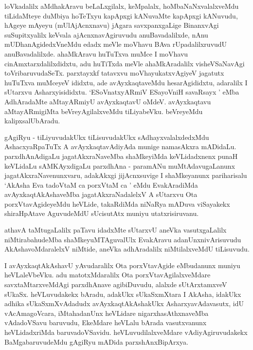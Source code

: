 \begin{artha}
loVkadalilx aMdhakAravu beLaLxgilalx, keMpalalx, hoMbaNaNxvalalxveMdu tiLidaMteye duMbiya hoTeTxyu kapApxgi kANuvaMte kapApxgi kANuvudu, hAgeye mAyeyu (mUlAjAcnxnavu) jAgara savxpanxgaLige BinanxvAgi suSupitxyalilx keVvala ajAcnxnavAgiruvudu anuBavadalilxde, nAnu mUDhanAgidedxVneMdu edadx meVle moVhavu BAva rUpadalilxruvudU anuBavadalilxde. ahaMkAravu huTuTxva muMce I moVhavu cinAmxtarxdalilxdidxtu, adu huTiTxda meVle ahaMkAradalilx visheVSaNavAgi toVribaruvudaSeTx. parxtayxkf tatavxvu moVhayukatxvAgiyeV jagatutx huTuTxva muMceyeV ididxtu, ade avAyxkaqtaveMdu hesarAgididxtu, adaralilx I sUtarxvu Asharxyisididxtu. `ESoV\s natxyARmiV ESayoVniH savaRsayx ' eMba AdhAradaMte aMtayARmiyU avAyxkaqtavU oMdeV. avAyxkaqtavu aMtayARmigiMta beVreyAgilalxveMdu tiLiyabeVku. beVreyeMdu kalipxsalUbAradu.
\end{artha}%


\begin{artha}
gAgiRyu - tiLiyuvudakUkx tiLisuvudakUkx sAdhayxvalalxdedxMdu AshacxyaRpaTuTx A avAyxkaqtavAdiyAda munige namasAkxra mADidaLu. parxdhAnAdigaLu jagatAkxraNaveMba shaMkeyiMda keVLidadxnenx punaH keVLidaLu sAMKAyxdigaLu parxdhAna - paramANu muMtAdavugaLanunx jagatAkxraNavenunxvaru, adakAkxgi jijAcnxsuvige I shaMkeyanunx pariharisalu `AkAsha Eva tadoVtaM ca porxVtaM ca ' eMdu EvakAradiMda avAyxkaqtAkAshaveMba jagatAkxraNadalelxV A sUtarxvu Ota porxVtavAgideyeMdu heVLide, takaRdiMda niNaRya mADuva viSayakekx shiraHpAtave AguvudeMdU sUcisutAtx muniyu utatxrisiruvanu. 
\end{artha}

\begin{artha}
athavA taMtugaLalilx paTavu idadxMte sUtarxvU aneVka vasutxgaLalilx niMtirabahudeMba shaMkeyuMTAguvalUlx EvakAravu adanUnxnivArisuvudu AkAshavoMdaralelxV niMtide, aneVka adhAradalilx niMtilalxveMdU tiLisuvudu.
\end{artha}


\begin{artha}
I avAyxkaqtAkAshavU yAvudaralilx Ota porxVtavAgide eMbudanunx muniyu heVLaleVbeVku. adu matotxMdaralilx Ota porxVtavAgilalxveMdare savxtaMtarxveMdAgi parxdhAnave agibiDuvudu, alalxde sUtArxtamxveV sUkaSx. heVLuvudakekx bAradu, adakUkx sUkaSxmXtara I AkAsha, idakUkx adhika sUkaSxmXvAdadudx avAyxkaqtAkAshakUkx AsharxyavAdavasutx, idU vAcAmagoVcara, iMtahadanUnx heVLidare nigarxhasAthxnaveMba vAdadoVSavu baruvudu, EkeMdare heVLalu bArada vasutxvanunx heVLidadxriMda baruvadoVSavidu. heVLuvudilalxveMdare vAdiyAgiruvudakekx BaMgabaruvudeMdu gAgiRyu mADida parxshAnxBipArxya.
\end{artha}%

